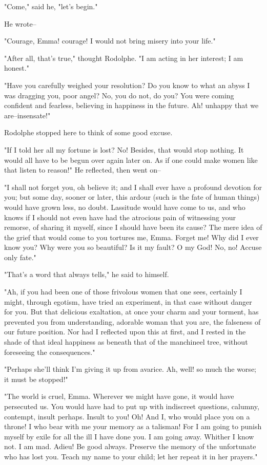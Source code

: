 \documentclass[11pt,twocolumn]{ltugboat}
\begin{document}
"Come," said he, "let's begin."

He wrote--

"Courage, Emma! courage! I would not bring misery into your life."

"After all, that's true," thought Rodolphe. "I am acting in her
interest; I am honest."

"Have you carefully weighed your resolution? Do you know to what an
abyss I was dragging you, poor angel? No, you do not, do you? You were
coming confident and fearless, believing in happiness in the future. Ah!
unhappy that we are--insensate!"

Rodolphe stopped here to think of some good excuse.

"If I told her all my fortune is lost? No! Besides, that would stop
nothing. It would all have to be begun over again later on. As if one
could make women like that listen to reason!" He reflected, then went
on--

"I shall not forget you, oh believe it; and I shall ever have a profound
devotion for you; but some day, sooner or later, this ardour (such is
the fate of human things) would have grown less, no doubt. Lassitude
would have come to us, and who knows if I should not even have had the
atrocious pain of witnessing your remorse, of sharing it myself, since
I should have been its cause? The mere idea of the grief that would come
to you tortures me, Emma. Forget me! Why did I ever know you? Why were
you so beautiful? Is it my fault? O my God! No, no! Accuse only fate."

"That's a word that always tells," he said to himself.

"Ah, if you had been one of those frivolous women that one sees,
certainly I might, through egotism, have tried an experiment, in that
case without danger for you. But that delicious exaltation, at once your
charm and your torment, has prevented you from understanding, adorable
woman that you are, the falseness of our future position. Nor had I
reflected upon this at first, and I rested in the shade of that ideal
happiness as beneath that of the manchineel tree, without foreseeing the
consequences."

"Perhaps she'll think I'm giving it up from avarice. Ah, well! so much
the worse; it must be stopped!"

"The world is cruel, Emma. Wherever we might have gone, it would have
persecuted us. You would have had to put up with indiscreet questions,
calumny, contempt, insult perhaps. Insult to you! Oh! And I, who would
place you on a throne! I who bear with me your memory as a talisman! For
I am going to punish myself by exile for all the ill I have done you.
I am going away. Whither I know not. I am mad. Adieu! Be good always.
Preserve the memory of the unfortunate who has lost you. Teach my name
to your child; let her repeat it in her prayers."
\end{document}
